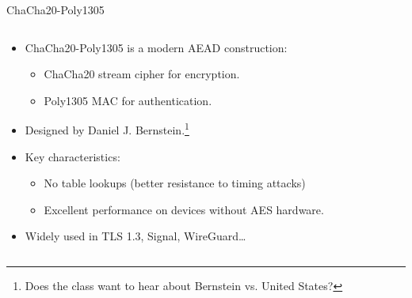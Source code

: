 \documentclass[aspectratio=169, lualatex, handout]{beamer}
\begin{document}
\begin{frame}{ChaCha20-Poly1305}
	\begin{columns}[c]
		\begin{column}{0.6\textwidth}
			\begin{itemize}[<+->]
				\item ChaCha20-Poly1305 is a modern AEAD construction:
				      \begin{itemize}
					      \item ChaCha20 stream cipher for encryption.
					      \item Poly1305 MAC for authentication.
				      \end{itemize}
				\item Designed by Daniel J. Bernstein.\footnote{Does the class want to hear about Bernstein vs. United States?}
				\item Key characteristics:
				      \begin{itemize}
					      \item No table lookups (better resistance to timing attacks)
					      \item Excellent performance on devices without AES hardware.
				      \end{itemize}
				\item Widely used in TLS 1.3, Signal, WireGuard\ldots
			\end{itemize}
		\end{column}
		\begin{column}{0.4\textwidth}
			\begin{center}
			\end{center}
		\end{column}
	\end{columns}
\end{frame}
\end{document}
